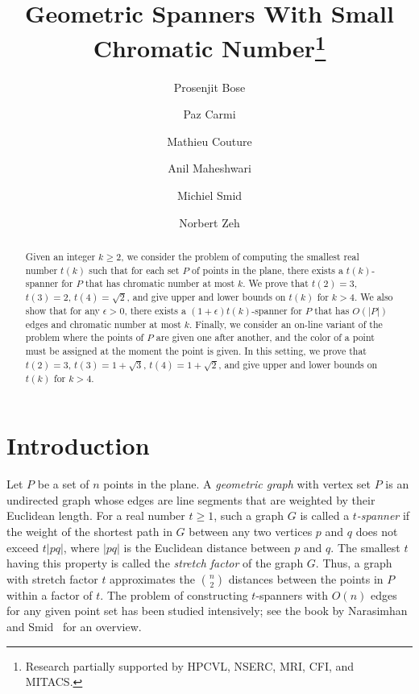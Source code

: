 \documentclass[pdftex,leqno,fleqn,12pts]{llncs}
\begin{document}
\title{Geometric Spanners With Small Chromatic 
   Number\thanks{Research partially supported by HPCVL, NSERC, MRI, 
                 CFI, and MITACS.}}
\author{Prosenjit Bose \and Paz Carmi \and Mathieu Couture \and 
Anil Maheshwari \and Michiel Smid \and Norbert Zeh}


\maketitle

\begin{abstract} 
Given an integer $k \geq 2$, we consider the problem of computing the smallest real number 
$t(k)$ such that for each set $P$ of points in the plane, there exists a $t(k)$-spanner for 
$P$ that has chromatic number at most $k$. 
We prove that $t(2) = 3$, $t(3) = 2$, $t(4) = \sqrt{2}$, and give upper and lower bounds on 
$t(k)$ for $k>4$. 
We also show that for any $\epsilon >0$, there exists a $(1+\epsilon)t(k)$-spanner for $P$ 
that has $O(|P|)$ edges and chromatic number at most $k$.
Finally, we consider an on-line variant of the problem where the points of $P$ are given one after 
another, and the color of a point must be assigned at the moment the point is given.
In this setting, we prove that $t(2) = 3$, $t(3) = 1+ \sqrt{3}$, $t(4) = 1+ \sqrt{2}$, and give 
upper and lower bounds on $t(k)$ for $k>4$. 
\end{abstract}





\section{Introduction} 
Let $P$ be a set of $n$ points in the plane. A \emph{geometric graph} 
with vertex set $P$ is an undirected graph whose edges are line segments 
that are weighted by their Euclidean length. For a real number $t \geq 1$, 
such a graph $G$ is called a \emph{$t$-spanner} if the weight of the 
shortest path in $G$ between any two vertices $p$ and $q$ does not exceed 
$t|pq|$, where $|pq|$ is the Euclidean distance between $p$ and $q$. 
The smallest $t$ having this property is called the \emph{stretch factor} 
of the graph $G$. Thus, a graph with stretch factor $t$ approximates the 
$n \choose 2$ distances between the points in $P$ within a factor of $t$. 
The problem of constructing $t$-spanners with $O(n)$ edges for any given 
point set has been studied intensively; see the book by 
Narasimhan and Smid~\cite{smid07} for an overview. 
\end{document}
